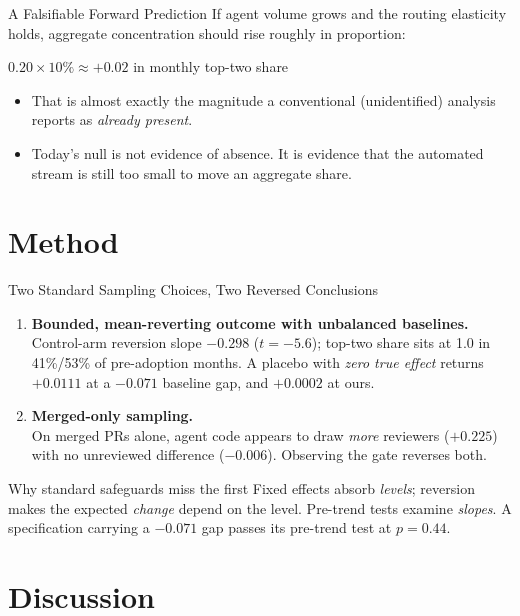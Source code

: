 \begin{frame}{A Falsifiable Forward Prediction}
If agent volume grows and the routing elasticity holds, aggregate
concentration should rise roughly in proportion:
\begin{center}\large
$0.20 \times 10\% \approx \mathbf{+0.02}$ in monthly top-two share
\end{center}
\vfill
\begin{itemize}
  \item That is almost exactly the magnitude a conventional (unidentified)
        analysis reports as \emph{already present}.
  \item Today's null is not evidence of absence. It is evidence that the
        automated stream is still too small to move an aggregate share.
\end{itemize}
\end{frame}

\section{Method}

\begin{frame}{Two Standard Sampling Choices, Two Reversed Conclusions}
\begin{enumerate}
  \item \textbf{Bounded, mean-reverting outcome with unbalanced baselines.}\\
        Control-arm reversion slope $-0.298$ ($t=-5.6$); top-two share sits at
        1.0 in 41\%/53\% of pre-adoption months. A placebo with
        \emph{zero true effect} returns $\mathbf{+0.0111}$ at a $-0.071$
        baseline gap, and $+0.0002$ at ours.
  \item \textbf{Merged-only sampling.}\\
        On merged PRs alone, agent code appears to draw \emph{more} reviewers
        ($+0.225$) with no unreviewed difference ($-0.006$). Observing the
        gate reverses both.
\end{enumerate}
\vfill
\begin{alertblock}{Why standard safeguards miss the first}
  Fixed effects absorb \emph{levels}; reversion makes the expected
  \emph{change} depend on the level. Pre-trend tests examine \emph{slopes}.
  A specification carrying a $-0.071$ gap passes its pre-trend test at $p=0.44$.
\end{alertblock}
\end{frame}

\section{Discussion}

